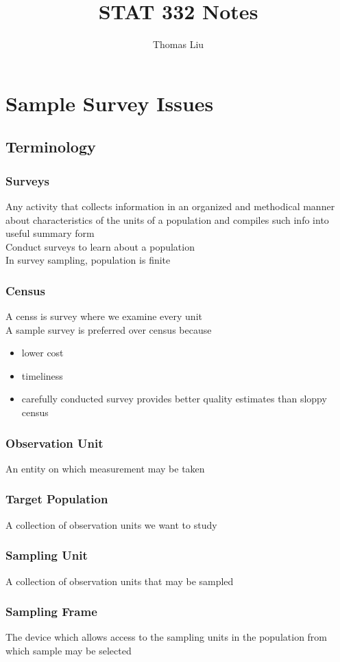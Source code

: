 \documentclass[11pt]{article}
\title{STAT 332 Notes}
\author{Thomas Liu}
\begin{document}
\maketitle
\tableofcontents

\newpage 
\section{Sample Survey Issues}
\subsection{Terminology}
\subsubsection{Surveys}
Any activity that collects information in an organized and methodical manner about characteristics of 
the units of a population and compiles such info into useful summary form \\
Conduct surveys to learn about a population \\
In survey sampling, population is finite
\subsubsection{Census}
A censs is survey where we examine every unit \\
A sample survey is preferred over census because
\begin{itemize}
    \item lower cost 
    \item timeliness 
    \item carefully conducted survey provides better quality estimates than sloppy census 
\end{itemize}
\subsubsection{Observation Unit}
An entity on which measurement may be taken 
\subsubsection{Target Population}
A collection of observation units we want to study
\subsubsection{Sampling Unit}
A collection of observation units that may be sampled
\subsubsection{Sampling Frame}
The device which allows access to the sampling units in the population from which sample may be selected 
\end{document}
